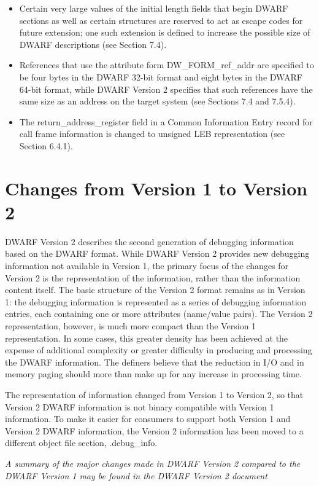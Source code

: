 \begin{itemize}
\item
Certain very large values of the initial length fields that
begin DWARF sections as well as certain structures are reserved
to act as escape codes for future extension; one such extension
is defined to increase the possible size of DWARF descriptions
(see Section 7.4).

\item
References that use the attribute form DW\-\_FORM\-\_ref\-\_addr
are specified to be four bytes in the DWARF 32-bit format and
eight bytes in the DWARF 64-bit format, while DWARF Version
2 specifies that such references have the same size as an
address on the target system (see Sections 7.4 and 7.5.4).

\item
The return\_address\_register field in a Common Information
Entry record for call frame information is changed to unsigned
LEB representation (see Section 6.4.1).

\end{itemize}


\section[Changes Version1 to 2]{Changes from Version 1 to Version 2}
DWARF Version 2 describes the second generation of debugging
information based on the DWARF format. While DWARF Version
2 provides new debugging information not available in
Version 1, the primary focus of the changes for Version
2 is the representation of the information, rather than
the information content itself. The basic structure of
the Version 2 format remains as in Version 1: the debugging
information is represented as a series of debugging information
entries, each containing one or more attributes (name/value
pairs). The Version 2 representation, however, is much more
compact than the Version 1 representation. In some cases,
this greater density has been achieved at the expense of
additional complexity or greater difficulty in producing and
processing the DWARF information. The definers believe that the
reduction in I/O and in memory paging should more than make
up for any increase in processing time.  

The representation
of information changed from Version 1 to Version 2, so that
Version 2 DWARF information is not binary compatible with
Version 1 information. To make it easier for consumers to
support both Version 1 and Version 2 DWARF information, the
Version 2 information has been moved to a different object
file section, .debug\_info.  

\textit{
A summary of the major changes
made in DWARF Version 2 compared to the DWARF Version 1 may
be found in the DWARF Version 2 document
}

